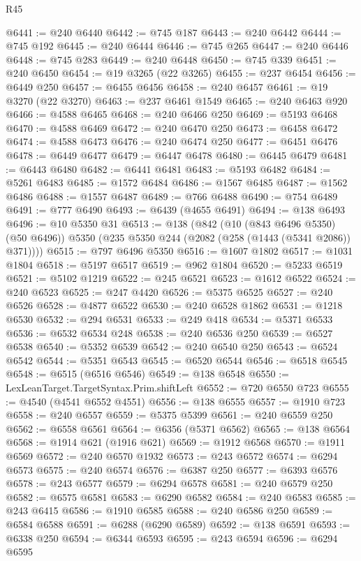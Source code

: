 \begin{lexlean}{R45}
\begin{coremodule}
{@6441 := @240 @6440
@6442 := @745 @187
@6443 := @240 @6442
@6444 := @745 @192
@6445 := @240 @6444
@6446 := @745 @265
@6447 := @240 @6446
@6448 := @745 @283
@6449 := @240 @6448
@6450 := @745 @339
@6451 := @240 @6450
@6454 := @19 @3265 (@22 @3265)
@6455 := @237 @6454
@6456 := @6449 @250
@6457 := @6455 @6456
@6458 := @240 @6457
@6461 := @19 @3270 (@22 @3270)
@6463 := @237 @6461 @1549
@6465 := @240 @6463 @920
@6466 := @4588 @6465
@6468 := @240 @6466 @250
@6469 := @5193 @6468
@6470 := @4588 @6469
@6472 := @240 @6470 @250
@6473 := @6458 @6472
@6474 := @4588 @6473
@6476 := @240 @6474 @250
@6477 := @6451 @6476
@6478 := @6449 @6477
@6479 := @6447 @6478
@6480 := @6445 @6479
@6481 := @6443 @6480
@6482 := @6441 @6481
@6483 := @5193 @6482
@6484 := @5261 @6483
@6485 := @1572 @6484
@6486 := @1567 @6485
@6487 := @1562 @6486
@6488 := @1557 @6487
@6489 := @766 @6488
@6490 := @754 @6489
@6491 := @777 @6490
@6493 := @6439 (@4655 @6491)
@6494 := @138 @6493
@6496 := @10 @5350 @31
@6513 := @138
    (@842
      (@10 (@843 @6496 @5350) (@50 @6496))
      @5350
      (@235 @5350 @244 (@2082 (@258 (@1443 (@5341 @2086)) @371))))
@6515 := @797 @6496 @5350
@6516 := @1607 @1802
@6517 := @1031 @1804
@6518 := @5197 @6517
@6519 := @962 @1804
@6520 := @5233 @6519
@6521 := @5102 @1219
@6522 := @245 @6521
@6523 := @1612 @6522
@6524 := @240 @6523
@6525 := @247 @4420
@6526 := @5375 @6525
@6527 := @240 @6526
@6528 := @4877 @6522
@6530 := @240 @6528 @1862
@6531 := @1218 @6530
@6532 := @294 @6531
@6533 := @249 @418
@6534 := @5371 @6533
@6536 := @6532 @6534 @248
@6538 := @240 @6536 @250
@6539 := @6527 @6538
@6540 := @5352 @6539
@6542 := @240 @6540 @250
@6543 := @6524 @6542
@6544 := @5351 @6543
@6545 := @6520 @6544
@6546 := @6518 @6545
@6548 := @6515 (@6516 @6546)
@6549 := @138 @6548
@6550 := LexLeanTarget.TargetSyntax.Prim.shiftLeft
@6552 := @720 @6550 @723
@6555 := @4540 (@4541 @6552 @4551)
@6556 := @138 @6555
@6557 := @1910 @723
@6558 := @240 @6557
@6559 := @5375 @5399
@6561 := @240 @6559 @250
@6562 := @6558 @6561
@6564 := @6356 (@5371 @6562)
@6565 := @138 @6564
@6568 := @1914 @621 (@1916 @621)
@6569 := @1912 @6568
@6570 := @1911 @6569
@6572 := @240 @6570 @1932
@6573 := @243 @6572
@6574 := @6294 @6573
@6575 := @240 @6574
@6576 := @6387 @250
@6577 := @6393 @6576
@6578 := @243 @6577
@6579 := @6294 @6578
@6581 := @240 @6579 @250
@6582 := @6575 @6581
@6583 := @6290 @6582
@6584 := @240 @6583
@6585 := @243 @6415
@6586 := @1910 @6585
@6588 := @240 @6586 @250
@6589 := @6584 @6588
@6591 := @6288 (@6290 @6589)
@6592 := @138 @6591
@6593 := @6338 @250
@6594 := @6344 @6593
@6595 := @243 @6594
@6596 := @6294 @6595
}
\end{coremodule}
\end{lexlean}
